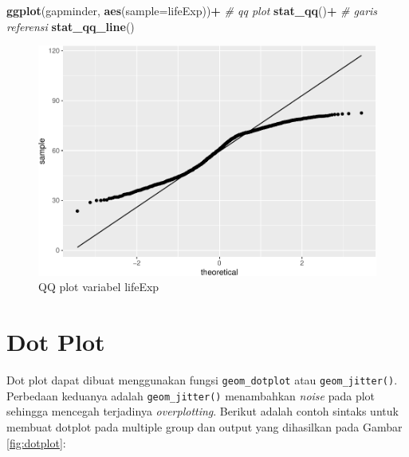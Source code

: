 \documentclass[]{book}
\newenvironment{Shaded}{\begin{snugshade}}{\end{snugshade}}
\newcommand{\KeywordTok}[1]{\textcolor[rgb]{0.13,0.29,0.53}{\textbf{#1}}}
\newcommand{\DataTypeTok}[1]{\textcolor[rgb]{0.13,0.29,0.53}{#1}}
\newcommand{\DecValTok}[1]{\textcolor[rgb]{0.00,0.00,0.81}{#1}}
\newcommand{\FloatTok}[1]{\textcolor[rgb]{0.00,0.00,0.81}{#1}}
\newcommand{\StringTok}[1]{\textcolor[rgb]{0.31,0.60,0.02}{#1}}
\newcommand{\CommentTok}[1]{\textcolor[rgb]{0.56,0.35,0.01}{\textit{#1}}}
\newcommand{\OperatorTok}[1]{\textcolor[rgb]{0.81,0.36,0.00}{\textbf{#1}}}
\newcommand{\NormalTok}[1]{#1}
\begin{document}
\begin{Shaded}
\begin{Highlighting}[]
\KeywordTok{ggplot}\NormalTok{(gapminder, }\KeywordTok{aes}\NormalTok{(}\DataTypeTok{sample=}\NormalTok{lifeExp))}\OperatorTok{+}
\StringTok{  }\CommentTok{# qq plot}
\StringTok{  }\KeywordTok{stat_qq}\NormalTok{()}\OperatorTok{+}
\StringTok{  }\CommentTok{# garis referensi}
\StringTok{  }\KeywordTok{stat_qq_line}\NormalTok{()}
\end{Highlighting}
\end{Shaded}

\begin{figure}

{\centering \includegraphics[width=0.7\linewidth]{EnvStat_files/figure-latex/ggqq-1} 

}

\caption{QQ plot variabel lifeExp}\label{fig:ggqq}
\end{figure}

\section{Dot Plot}\label{dot-plot}

Dot plot dapat dibuat menggunakan fungsi \texttt{geom\_dotplot} atau
\texttt{geom\_jitter()}. Perbedaan keduanya adalah
\texttt{geom\_jitter()} menambahkan \emph{noise} pada plot sehingga
mencegah terjadinya \emph{overplotting}. Berikut adalah contoh sintaks
untuk membuat dotplot pada multiple group dan output yang dihasilkan
pada Gambar \ref{fig:dotplot}:

\begin{Shaded}
\end{Shaded}
\end{document}
